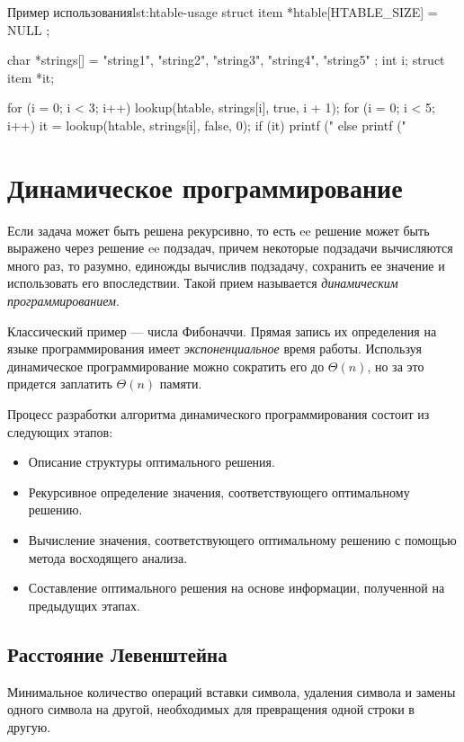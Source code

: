 \begin{clst}{Пример использования}{lst:htable-usage}
struct item *htable[HTABLE_SIZE] = { NULL };

char *strings[] = { "string1", "string2", "string3",
                    "string4", "string5" };
int i;
struct item *it;

for (i = 0; i < 3; i++)
    lookup(htable, strings[i], true, i + 1);
for (i = 0; i < 5; i++) {
    it = lookup(htable, strings[i], false, 0);
    if (it)
        printf ("%
    else
        printf ("%
}
\end{clst}

\section{Динамическое программирование}
\label{sec:dyn-programming}

Если задача может быть решена рекурсивно, то есть ee решение может быть выражено через решение ee подзадач, причем некоторые подзадачи вычисляются много раз, то разумно, единожды вычислив подзадачу, сохранить ее значение и использовать его впоследствии. Такой прием называется \emph{динамическим программированием}.

Классический пример --- числа Фибоначчи. Прямая запись их определения на языке программирования имеет \emph{экспоненциальное} время работы. Используя динамическое программирование можно сократить его до $\Theta(n)$, но за это придется заплатить $\Theta(n)$ памяти.

Процесс разработки алгоритма динамического программирования состоит из следующих этапов:
\begin{itemize}
  \item Описание структуры оптимального решения.
  \item Рекурсивное определение значения, соответствующего оптимальному решению.
  \item Вычисление значения, соответствующего оптимальному решению с помощью метода восходящего анализа.
  \item Составление оптимального решения на основе информации, полученной на предыдущих этапах.
\end{itemize}

\subsection{Расстояние Левенштейна}
Минимальное количество операций вставки символа, удаления символа и замены одного символа на другой, необходимых для превращения одной строки в другую.

